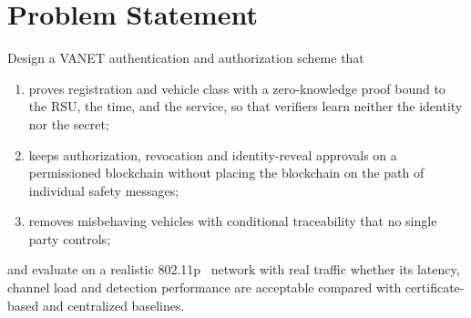 \section{Problem Statement}

Design a VANET authentication and authorization scheme that
\begin{enumerate}
  \item proves registration and vehicle class with a zero-knowledge proof bound to the RSU, the time,
  and the service, so that verifiers learn neither the identity nor the secret;
  \item keeps authorization, revocation and identity-reveal approvals on a permissioned blockchain
  without placing the blockchain on the path of individual safety messages;
  \item removes misbehaving vehicles with conditional traceability that no single party controls;
\end{enumerate}
and evaluate on a realistic 802.11p~\cite{jiang2008wave} network with real traffic whether its latency, channel load and
detection performance are acceptable compared with certificate-based and centralized baselines.
